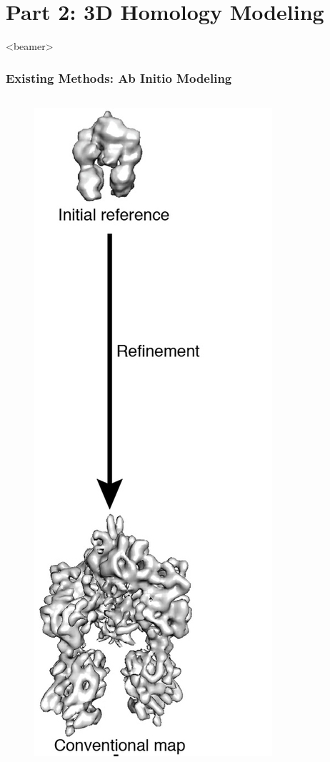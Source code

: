 \documentclass{beamer}
\begin{document}
\section{Part 2: 3D Homology Modeling}

\begin{frame}<beamer>
\frametitle{Existing Methods: Ab Initio Modeling}
\begin{columns}
\begin{figure}
\centering
\includegraphics[width=.7 \columnwidth]{figures/refinement.png}

\end{figure}
\end{columns}
\end{frame}
\end{document}
